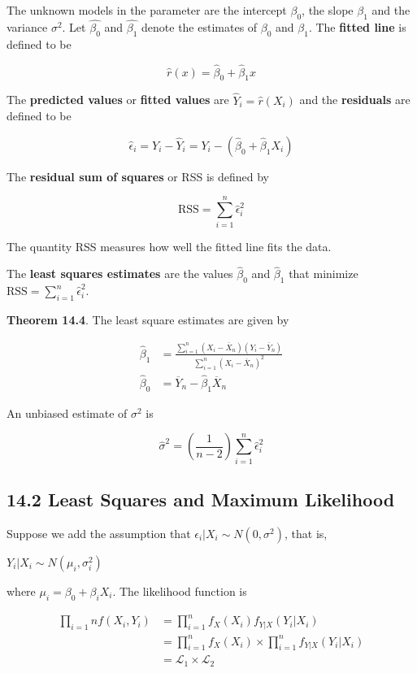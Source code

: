 The unknown models in the parameter are the intercept \(\beta_0\), the
slope \(\beta_1\) and the variance \(\sigma^2\). Let \(\hat{\beta_0}\)
and \(\hat{\beta_1}\) denote the estimates of \(\beta_0\) and
\(\beta_1\). The \textbf{fitted line} is defined to be

\[\hat{r}(x) = \hat{\beta}_0 + \hat{\beta}_1 x\]

The \textbf{predicted values} or \textbf{fitted values} are
\(\hat{Y}_i = \hat{r}(X_i)\) and the \textbf{residuals} are defined to
be

\[\hat{\epsilon}_i = Y_i - \hat{Y}_i = Y_i - (\hat{\beta}_0 + \hat{\beta}_1 X_i)\]

The \textbf{residual sum of squares} or RSS is defined by

\[ \text{RSS} = \sum_{i=1}^n \hat{\epsilon}_i^2\]

The quantity RSS measures how well the fitted line fits the data.

The \textbf{least squares estimates} are the values \(\hat{\beta}_0\)
and \(\hat{\beta}_1\) that minimize
\(\text{RSS} = \sum_{i=1}^n \hat{\epsilon}_i^2\).

\textbf{Theorem 14.4}. The least square estimates are given by

\begin{align}
\hat{\beta}_1 &= \frac{\sum_{i=1}^n (X_i - \overline{X}_n) (Y_i - \overline{Y}_n)}{\sum_{i=1}^n (X_i - \overline{X}_n)^2}\\
\hat{\beta}_0 &= \overline{Y}_n - \hat{\beta}_1 \overline{X}_n
\end{align}

An unbiased estimate of \(\sigma^2\) is

\[
\hat{\sigma}^2 = \left( \frac{1}{n - 2} \right) \sum_{i=1}^n \hat{\epsilon}_i^2
\]

\subsection{14.2 Least Squares and Maximum
Likelihood}\label{least-squares-and-maximum-likelihood}

Suppose we add the assumption that
\(\epsilon_i | X_i \sim N(0, \sigma^2)\), that is,

\(Y_i | X_i \sim N(\mu_i, \sigma_i^2)\)

where \(\mu_i = \beta_0 + \beta_i X_i\). The likelihood function is

\begin{align}
\prod_{i=1}n f(X_i, Y_i) &= \prod_{i=1}^n f_X(X_i) f_{Y|X}(Y_i | X_i)\\
&= \prod_{i=1}^n f_X(X_i) \times \prod_{i=1}^n f_{Y|X}(Y_i | X_i) \\
&= \mathcal{L}_1 \times \mathcal{L}_2
\end{align}

